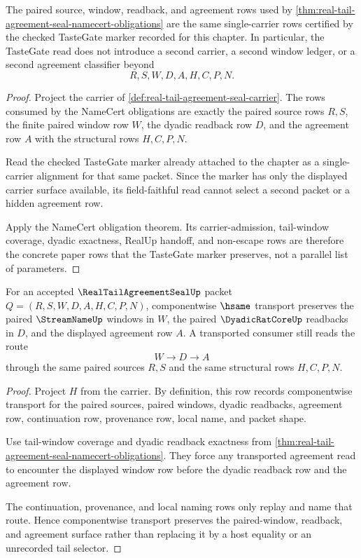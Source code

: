 \begin{theorem}
\label{thm:real-tail-agreement-seal-tastegate-obligation-route}
The paired source, window, readback, and agreement rows used by \autoref{thm:real-tail-agreement-seal-namecert-obligations} are the same single-carrier rows certified by the checked TasteGate marker recorded for this chapter. In particular, the TasteGate read does not introduce a second carrier, a second window ledger, or a second agreement classifier beyond
$$
R,S,W,D,A,H,C,P,N.
$$
\end{theorem}
\begin{proof}
Project the carrier of \autoref{def:real-tail-agreement-seal-carrier}. The rows consumed by the NameCert obligations are exactly the paired source rows $R,S$, the finite paired window row $W$, the dyadic readback row $D$, and the agreement row $A$ with the structural rows $H,C,P,N$.

Read the checked TasteGate marker already attached to the chapter as a single-carrier alignment for that same packet. Since the marker has only the displayed carrier surface available, its field-faithful read cannot select a second packet or a hidden agreement row.

Apply the NameCert obligation theorem. Its carrier-admission, tail-window coverage, dyadic exactness, RealUp handoff, and non-escape rows are therefore the concrete paper rows that the TasteGate marker preserves, not a parallel list of parameters.
\end{proof}

\begin{theorem}
\label{thm:real-tail-agreement-seal-paired-window-transport}
For an accepted $\RealTailAgreementSealUp$ packet $Q=(R,S,W,D,A,H,C,P,N)$, componentwise $\hsame$ transport preserves the paired $\StreamNameUp$ windows in $W$, the paired $\DyadicRatCoreUp$ readbacks in $D$, and the displayed agreement row $A$. A transported consumer still reads the route
$$
W \to D \to A
$$
through the same paired sources $R,S$ and the same structural rows $H,C,P,N$.
\end{theorem}
\begin{proof}
Project $H$ from the carrier. By definition, this row records componentwise transport for the paired sources, paired windows, dyadic readbacks, agreement row, continuation row, provenance row, local name, and packet shape.

Use tail-window coverage and dyadic readback exactness from \autoref{thm:real-tail-agreement-seal-namecert-obligations}. They force any transported agreement read to encounter the displayed window row before the dyadic readback row and the agreement row.

The continuation, provenance, and local naming rows only replay and name that route. Hence componentwise transport preserves the paired-window, readback, and agreement surface rather than replacing it by a host equality or an unrecorded tail selector.
\end{proof}

